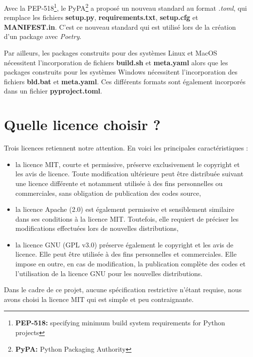\documentclass[twoside,a4paper,11pt,frenchb,openany]{report}
\begin{document}
Avec la PEP-518\footnote{\textbf{PEP-518:} specifying minimum build system requirements for Python projects}, le PyPA\footnote{\textbf{PyPA:} Python Packaging Authority} a proposé un nouveau standard au format \textit{.toml}, qui remplace les fichiers \textbf{setup.py}, \textbf{requirements.txt}, \textbf{setup.cfg} et \textbf{MANIFEST.in}. C'est ce nouveau standard qui est utilisé lors de la création d'un package avec \textit{Poetry}.

 Par ailleurs, les packages construits pour des systèmes Linux et MacOS nécessitent l'incorporation de fichiers \textbf{build.sh} et \textbf{meta.yaml} alors que les packages construits pour les systèmes Windows nécessitent l'incorporation des fichiers \textbf{bld.bat} et \textbf{meta.yaml}. Ces différents formats sont également incorporés dans un fichier \textbf{pyproject.toml}.



\section{Quelle licence choisir ?}
	
Trois licences retiennent notre attention. En voici les principales caractéristiques :
\begin{itemize}
\item	la licence MIT, courte et permissive, préserve exclusivement le copyright et les avis de licence. Toute modification ultérieure peut être distribuée suivant une licence différente et notamment utilisée à des fins personnelles ou commerciales, sans obligation de publication des codes source,
\item	la licence Apache (2.0) est également permissive et sensiblement similaire dans ses conditions à la licence MIT. Toutefois, elle requiert de préciser les modifications effectuées lors de nouvelles distributions,
\item	la licence GNU (GPL v3.0) préserve également le copyright et les avis de licence. Elle peut être utilisée à des fins personnelles et commerciales. Elle impose en outre, en cas de modification, la publication complète des codes et l'utilisation de la licence GNU pour les nouvelles distributions.
\end{itemize}

Dans le cadre de ce projet, aucune spécification restrictive n'étant requise, nous avons choisi la licence MIT qui est simple et peu contraignante.
\end{document}
